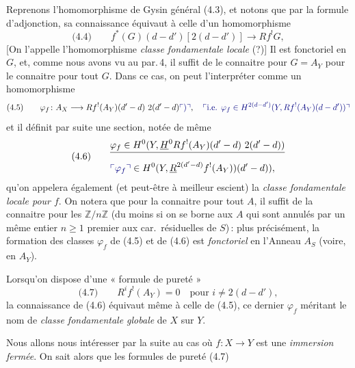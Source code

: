 \documentclass[11pt,a4paper]{article}
\begin{document}
Reprenons l'homomorphisme de Gysin général (4.3), et notons que par la
formule d'adjonction, sa connaissance équivaut à celle d'un homomorphisme
\[
\text{(4.4)}\qquad f^{*}(G)(d-d')[2(d-d')] \longrightarrow Rf^{!}G ,
\]
[On l'appelle l'homomorphisme \emph{classe fondamentale locale} (?)] Il est
fonctoriel en $G$, et, comme nous avons vu au par.\,4, il suffit de le
connaitre pour $G = A_Y$ pour le connaitre pour tout $G$. Dans ce cas, on
peut l'interpréter comme un homomorphisme
\[
\text{(4.5)}\qquad \varphi_f\colon A_X \longrightarrow
Rf^{!}(A_Y)(d'-d)\ 2(d'-d)\add{)} ,\quad
\add{\text{i.e. } \varphi_f \in H^{2(d-d')}(Y, Rf^{!}(A_Y)(d-d'))}
\]
et il définit par suite une section, notée de même
\[
\text{(4.6)}\qquad
\begin{aligned}
&\struck{\varphi_f \in H^0(Y, \underline{H}^0 Rf^{!}(A_Y)(d'-d)\ 2(d'-d))}\\
&\add{\varphi_f} \in H^0(Y, \underline{R}^{2(d'-d)} f^{!}(A_Y))(d'-d)) ,
\end{aligned}
\]
qu'on appelera également (et peut-être à meilleur escient) la \emph{classe
fondamentale locale pour $f$}. On notera que pour la connaitre pour tout
$A$, il suffit de la connaitre pour les $\mathbb{Z}/n\mathbb{Z}$ (du moins
si on se borne aux $A$ qui sont annulés par un même entier $n \geqslant 1$
premier aux car.\ résiduelles de $S$)\,:  plus précisément, la formation des classes
$\varphi_f$ de (4.5) et de (4.6) est \emph{fonctoriel} en l'Anneau $A_S$
(voire, en $A_Y$).

Lorsqu'on dispose d'une « formule de pureté »
\[
\text{(4.7)}\qquad R^i f^{!}(A_Y) = 0 \quad \text{pour } i \neq 2(d-d') ,
\]
la connaissance de (4.6) équivaut même à celle de (4.5), ce dernier
$\varphi_f$ méritant le nom de \emph{classe fondamentale globale} de $X$
sur $Y$.

Nous allons nous intéresser par la suite au cas où $f\colon X \to Y$ est
une \emph{immersion fermée}. On sait alors que les formules de pureté (4.7)
\end{document}
